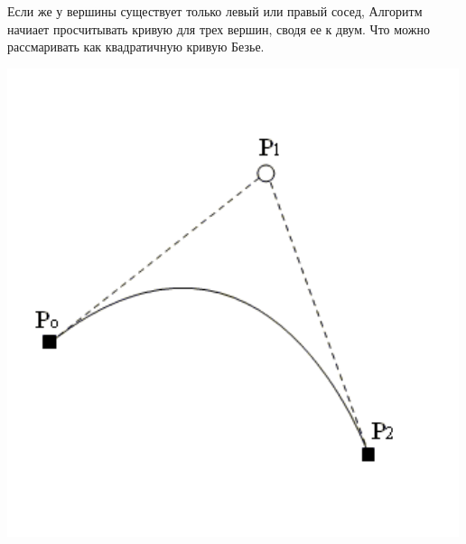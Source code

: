 Если же у вершины существует только левый или правый сосед, Алгоритм начиает просчитывать кривую для трех вершин, сводя ее к двум. Что можно рассмаривать как квадратичную кривую Безье.

\includegraphics[scale=0.5]{pictures/2.png}


